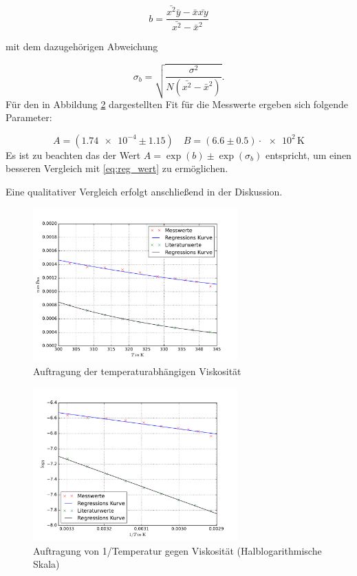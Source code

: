 \begin{equation*}
b=\frac{\bar{x^2}\bar{y}-\bar{x}\bar{xy}}{\bar{x^2}-\bar{x}^2}
\end{equation*}

mit dem dazugehörigen Abweichung

\begin{equation*}
\sigma_b=\sqrt{\frac{\sigma^2}{N\left(\bar{x^2}-\bar{x}^2\right)}}.
\end{equation*}
Für den in Abbildung \ref{fig:t_v_l_v} dargestellten Fit für die Messwerte ergeben sich
folgende Parameter:

\begin{equation}
\label{eq:lreg}
A=\left(\num{1.74e-4}\pm\num{1.15}\right) \quad B=\left(\num{6.6} \pm\num{0.5}\right)\cdot\num{e+2}\,\si{\kelvin} 
\end{equation}
Es ist zu beachten das der Wert $A=\exp(b)\pm\exp(\sigma_b)$ entspricht, um einen 
besseren Vergleich mit \eqref{eq:reg_wert} zu ermöglichen.

Eine qualitativer Vergleich erfolgt anschließend in der Diskussion. %

\FloatBarrier
\begin{figure}
\centering
\includegraphics[width=0.7\textwidth]{pics/viskositaet_temp_mit_lit.pdf}
\caption{Auftragung der temperaturabhängigen Viskosität} %
\label{fig:t_v_v}
\end{figure}

\begin{figure}
\centering
\includegraphics[width=0.7\textwidth]{pics/viskositaet_temp__log_mit_lit.pdf}
\caption{ Auftragung von 1/Temperatur gegen Viskosität (Halblogarithmische Skala)} %
\label{fig:t_v_l_v}
\end{figure}
\FloatBarrier

